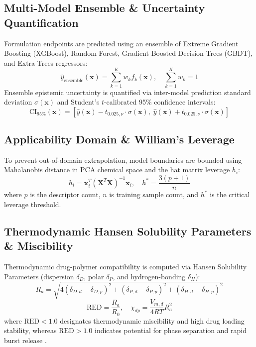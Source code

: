 \documentclass[twocolumn,10pt,3p]{elsarticle}
\begin{document}
\subsection{Multi-Model Ensemble \& Uncertainty Quantification}
Formulation endpoints are predicted using an ensemble of Extreme Gradient Boosting (XGBoost), Random Forest, Gradient Boosted Decision Trees (GBDT), and Extra Trees regressors:
\begin{equation}
\hat{y}_{\text{ensemble}}(\mathbf{x}) = \sum_{k=1}^{K} w_k f_k(\mathbf{x}), \quad \sum_{k=1}^{K} w_k = 1
\end{equation}
Ensemble epistemic uncertainty is quantified via inter-model prediction standard deviation $\sigma(\mathbf{x})$ and Student's $t$-calibrated 95\% confidence intervals:
\begin{equation}
\text{CI}_{95\%}(\mathbf{x}) = \left[ \hat{y}(\mathbf{x}) - t_{0.025, \nu} \cdot \sigma(\mathbf{x}), \; \hat{y}(\mathbf{x}) + t_{0.025, \nu} \cdot \sigma(\mathbf{x}) \right]
\end{equation}

\subsection{Applicability Domain \& William's Leverage}
To prevent out-of-domain extrapolation, model boundaries are bounded using Mahalanobis distance in PCA chemical space and the hat matrix leverage $h_i$:
\begin{equation}
h_i = \mathbf{x}_i^T (\mathbf{X}^T \mathbf{X})^{-1} \mathbf{x}_i, \quad h^* = \frac{3(p + 1)}{n}
\end{equation}
where $p$ is the descriptor count, $n$ is training sample count, and $h^*$ is the critical leverage threshold.

\subsection{Thermodynamic Hansen Solubility Parameters \& Miscibility}
Thermodynamic drug-polymer compatibility is computed via Hansen Solubility Parameters (dispersion $\delta_D$, polar $\delta_P$, and hydrogen-bonding $\delta_H$):
\begin{equation}
R_a = \sqrt{4(\delta_{D,d} - \delta_{D,p})^2 + (\delta_{P,d} - \delta_{P,p})^2 + (\delta_{H,d} - \delta_{H,p})^2}
\end{equation}
\begin{equation}
\text{RED} = \frac{R_a}{R_0}, \quad \chi_{dp} = \frac{V_{m,d}}{4 R T} R_a^2
\end{equation}
where $\text{RED} < 1.0$ designates thermodynamic miscibility and high drug loading stability, whereas $\text{RED} > 1.0$ indicates potential for phase separation and rapid burst release \cite{hansen2007solubility}.
\end{document}
